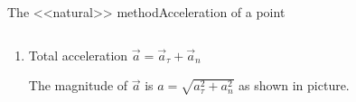 \documentclass[18pt]{LectMechanics}
\begin{document}
\begin{frame}{The <<natural>> method}{Acceleration of a point}
\begin{columns}
\begin{column}{0.6\linewidth}
\begin{enumerate}
				      {\small where $\rho$ of the corresponding circle as the radius of curvature of the path at
					      the same point.}

				\item<3-> Total acceleration \textcolor{green!50!black}{$\vec a =  \vec a_\tau + \vec a_n$}

				      {\small The magnitude of $\vec a$ is $a = \sqrt{a_\tau^2 + a_n^2}$ as shown in picture.}
			\end{enumerate}
		\end{column}
	\end{columns}

\end{frame}
\end{document}

